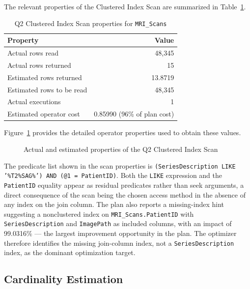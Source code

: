 The relevant properties of the Clustered Index Scan are summarized in Table~\ref{tab:q2-scan}.

\begin{table}[htbp]
\centering
\caption{Q2 Clustered Index Scan properties for \texttt{MRI\_Scans}}
\label{tab:q2-scan}
\begin{tabular}{lr}
\toprule
Property & Value \\
\midrule
Actual rows read & 48,345 \\
Actual rows returned & 15 \\
Estimated rows returned & 13.8719 \\
Estimated rows to be read & 48,345 \\
Actual executions & 1 \\
Estimated operator cost & 0.85990 (96\% of plan cost) \\
\bottomrule
\end{tabular}
\end{table}

Figure~\ref{fig:q2-operator} provides the detailed operator properties used to obtain these values.

\begin{figure}[htbp]
\centering
{}
\caption{Actual and estimated properties of the Q2 Clustered Index Scan}
\label{fig:q2-operator}
\end{figure}

The predicate list shown in the scan properties is \texttt{(SeriesDescription LIKE '\%T2\%SAG\%') AND (@1 = PatientID)}. Both the \texttt{LIKE} expression and the \texttt{PatientID} equality appear as residual predicates rather than seek arguments, a direct consequence of the scan being the chosen access method in the absence of any index on the join column. The plan also reports a missing-index hint suggesting a nonclustered index on \texttt{MRI\_Scans.PatientID} with \texttt{SeriesDescription} and \texttt{ImagePath} as included columns, with an impact of 99.0316\% --- the largest improvement opportunity in the plan. The optimizer therefore identifies the missing join-column index, not a \texttt{SeriesDescription} index, as the dominant optimization target.

\subsection{Cardinality Estimation}

